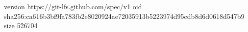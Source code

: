 version https://git-lfs.github.com/spec/v1
oid sha256:ca616b3bf9fa783fb2e8020924ae72035913b5223974d95cdb8d6d0618d547b9
size 526704

